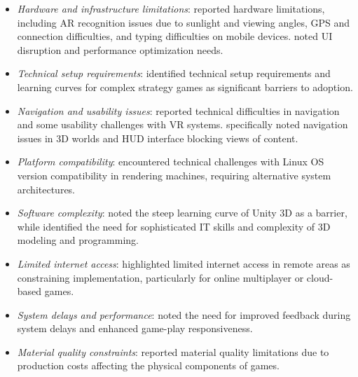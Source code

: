 \documentclass[a4paper,fleqn]{cas-sc}
\begin{document}
\begin{itemize}[noitemsep]
 \item \textit{Hardware and infrastructure limitations}: \citet{40Kuran2018, 49Huizenga2007127, 60Hoy2018, 69Wong2017150, 77Ramansyah2021} reported hardware limitations, including AR recognition issues due to sunlight and viewing angles, GPS and connection difficulties, and typing difficulties on mobile devices. \citet{22Nugroho2020149} noted UI disruption and performance optimization needs.
 
 \item \textit{Technical setup requirements}: \citet{51Ardito2007} identified technical setup requirements and learning curves for complex strategy games as significant barriers to adoption.
 
 \item \textit{Navigation and usability issues}: \citet{1Barbatsis201159, 73Wolfartsberger2011160} reported technical difficulties in navigation and some usability challenges with VR systems. \citet{73Wolfartsberger2011160} specifically noted navigation issues in 3D worlds and HUD interface blocking views of content.
 
 \item \textit{Platform compatibility}: \citet{63Liu2021} encountered technical challenges with Linux OS version compatibility in rendering machines, requiring alternative system architectures.
 
 \item \textit{Software complexity}: \citet{14Forsyth2023} noted the steep learning curve of Unity 3D as a barrier, while \citet{25Repantis2011502} identified the need for sophisticated IT skills and complexity of 3D modeling and programming.
 
 \item \textit{Limited internet access}: \citet{77Ramansyah2021} highlighted limited internet access in remote areas as constraining implementation, particularly for online multiplayer or cloud-based games.
 
 \item \textit{System delays and performance}: \citet{49Huizenga2007127} noted the need for improved feedback during system delays and enhanced game-play responsiveness.
 
 \item \textit{Material quality constraints}: \citet{54Gibson2007} reported material quality limitations due to production costs affecting the physical components of games.
\end{itemize}
\end{document}

